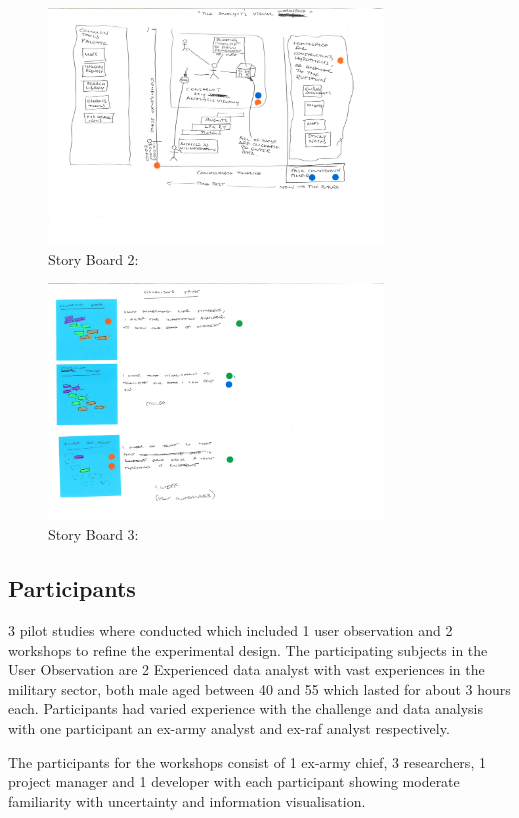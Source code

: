 \documentclass[journal]{vgtc}                %
\begin{document}
\begin{figure}[htb]
 \centering
 \includegraphics[width=3.5in]{img/james}
 \caption{ Story Board 2: }
\end{figure}

\begin{figure}[htb]
 \centering
 \includegraphics[width=3.5in]{img/mike}
 \caption{ Story Board 3: }
\end{figure}


\subsection{Participants}
3 pilot studies where conducted which included 1 user observation and 2 workshops to refine the experimental design. The participating subjects in the User Observation are 2 Experienced data analyst with vast experiences in the military sector, both male aged between 40 and 55 which lasted for about 3 hours each. Participants had varied experience with the challenge and data analysis with one participant an ex-army analyst and ex-raf analyst respectively.

The participants for the workshops consist of 1 ex-army chief, 3 researchers, 1 project manager and 1 developer with each participant showing moderate familiarity with uncertainty and information visualisation.
\end{document}

